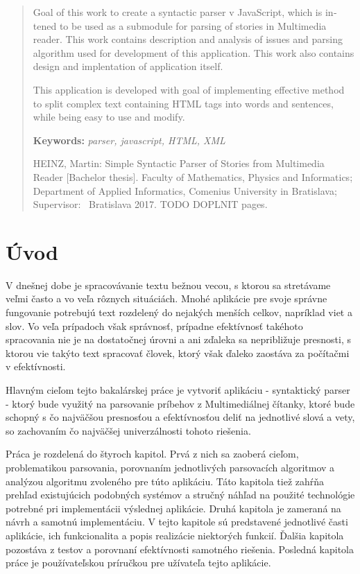 \documentclass[12pt,a4paper]{report}
\theoremstyle{definition}
\theoremstyle{remark}
\begin{document}
\begin{otherlanguage}{english}
\begin{abstract}

Goal of this work to create a syntactic parser v JavaScript, which is intened to be used as a submodule for parsing of stories in Multimedia reader. This work contains description and analysis of issues and parsing algorithm used for development of this application. This work also contains design and implentation of application itself.


This application is developed with goal of implementing effective method to split complex text containing HTML tags into words and sentences, while being easy to use and modify.

\bigskip\noindent
\textbf{Keywords:} \textit{parser, javascript, HTML, XML} 

\bigskip
HEINZ, Martin: Simple Syntactic Parser of Stories from Multimedia Reader [Bachelor thesis]. Faculty of Mathematics, Physics and Informatics;
Department of Applied Informatics, Comenius University in Bratislava; Supervisor: \skolitel \ Bratislava 2017. TODO DOPLNIT pages.

\end{abstract}
\end{otherlanguage}
\setcounter{tocdepth}{1}
\tableofcontents

\chapter*{Úvod}
V dnešnej dobe je spracovávanie textu bežnou vecou, s ktorou sa stretávame veľmi často a vo veľa rôznych situáciách. Mnohé aplikácie pre svoje správne fungovanie potrebujú text rozdelený do nejakých menších celkov, napríklad viet a slov. Vo veľa prípadoch však správnosť, prípadne efektívnosť takéhoto spracovania nie je na dostatočnej úrovni a ani zďaleka sa nepribližuje presnosti, s ktorou vie takýto text spracovať človek, ktorý však ďaleko zaostáva za počítačmi v efektívnosti.
\bigskip


Hlavným cieľom tejto bakalárskej práce je vytvoriť aplikáciu  - syntaktický parser - ktorý bude využitý na parsovanie príbehov z Multimediálnej čítanky, ktoré bude schopný s čo najväčšou presnosťou a efektívnosťou deliť na jednotlivé slová a vety, so zachovaním čo najväčšej univerzálnosti tohoto riešenia.
\bigskip


Práca je rozdelená do štyroch kapitol. Prvá z nich sa zaoberá cieľom, problematikou parsovania, porovnaním jednotlivých parsovacích algoritmov a analýzou algoritmu zvoleného pre túto aplikáciu. Táto kapitola tiež zahŕňa prehľad existujúcich podobných systémov a stručný náhľad na použité technológie potrebné pri implementácii výslednej aplikácie. Druhá kapitola je zameraná na návrh a samotnú implementáciu. V tejto kapitole sú predstavené jednotlivé časti aplikácie, ich funkcionalita a popis realizácie niektorých funkcií. Ďalšia kapitola pozostáva z testov a porovnaní  efektívnosti samotného riešenia. Posledná kapitola práce je používateľskou príručkou pre užívateľa tejto aplikácie.
\bigskip
\end{document}
